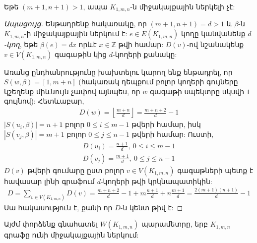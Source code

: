 \begin{theorem}
\label{t1_K1mn_nocoprime}
Եթե $(m+1,n+1)>1$, ապա $K_{1,m,n}$-ն միջակայքային ներկելի չէ:
\end{theorem}
\begin{proof}[Ապացույց]
Ենթադրենք հակառակը, որ $(m+1,n+1) = d >1$ և $\beta$-ն $K_{1,m,n}$-ի միջակայքային ներկում է:
$e \in E(K_{1,m,n})$ կողը կանվանենք \emph{$d$-կող}, եթե $\beta(e) = dx$ որևէ $x \in \mathbb{Z}$ թվի համար: $D(v)$-ով նշանակենք $v \in V(K_{1,m,n})$ գագաթին կից $d$-կողերի քանակը:

Առանց ընդհանրությունը խախտելու կարող ենք ենթադրել, որ $S(w,\beta) = [1,m+n]$
(հակառակ դեպքում բոլոր կողերի գույները կշեղենք միևնույն չափով այնպես, որ $w$ գագաթի սպեկտրը սկսվի $1$ գույնով): Հետևաբար,
\begin{align*}
D(w) = \left\lfloor \frac{m+n}{d} \right\rfloor = \frac{m+n+2}{d}-1
\end{align*}
$\left| S(u_i, \beta) \right| = n+1$ բոլոր $0\leq i \leq m-1$ թվերի համար, իսկ $\left|
S(v_j, \beta) \right| = m+1$ բոլոր $0\leq j \leq n-1$ թվերի համար: Ուստի,
\begin{align*}
D(u_i) = \frac{n+1}{d},\ 0\leq i \leq m-1\\
D(v_j) = \frac{m+1}{d},\ 0\leq j \leq n-1
\end{align*}
$D(v)$ թվերի գումարը ըստ բոլոր $v \in V(K_{1,m,n})$ գագաթների պետք է հավասար լինի գրաֆում $d$-կողերի թվի կրկնապատիկին:
\begin{align*}
D = \sum_{v \in V(K_{1,m,n})}{D(v)} = \frac{m+n+2}{d}-1 + m\frac{n+1}{d} +
n\frac{m+1}{d} = \frac{2(m+1)(n+1)}{d} - 1
\end{align*}
Սա հակասություն է, քանի որ $D$-ն կենտ թիվ է:
\end{proof}

Այժմ փորձենք գնահատել $W(K_{1,m,n})$ պարամետրը, երբ $K_{1,m,n}$ գրաֆը ունի միջակայքային ներկում:

